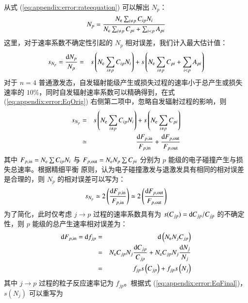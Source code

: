 从式 (\ref{eq:appendix:error:rateequation}) 可以解出 $N_p$：
\begin{equation}
N_p=\frac{N_{\rm e}\sum_{i\ne p}C_{ip}N_i}{N_{\rm e}\sum_{i\ne p}C_{pi}+\sum_{i<p}A_{pi}}
\label{eq:appendix:error:Np}
\end{equation}
这里，对于速率系数不确定性引起的 $N_p$ 相对误差，我们计入最大估计值\cite{YuChangxuan:book}：
\begin{eqnarray}
s_{N_p}=\frac{{\rm d}N_p}{N_p}& = &s\left(N_{\rm e}\sum_{i\ne p}C_{ip}N_i\right) + s\left(N_{\rm e}\sum_{i\ne p}C_{pi}+\sum_{i<p}A_{pi}\right)%
\label{eq:appendix:error:EqOrig}
\end{eqnarray}
对于 $n=4$ 普通激发态，自发辐射能级产生或损失过程的速率小于总产生或损失速率的 $10\%$，同时自发辐射速率系数可以精确得到\cite{NISTdatabase}，在式 (\ref{eq:appendix:error:EqOrig}) 右侧第二项中，忽略自发辐射过程的影响，则
\begin{eqnarray}
s_{N_p}& = &s\left(N_{\rm e}\sum_{i\ne p}C_{ip}N_i\right) + s\left(N_{\rm e}\sum_{i\ne p}C_{pi}\right) \nonumber\\
            & \simeq & \frac{{\rm d}F_{p,{\rm in}}}{F_{p,{\rm in}}} + \frac{{\rm d}F_{p,{\rm out}}}{F_{p,{\rm out}}}
\label{eq:appendix:error:EqIgnoreAqi}
\end{eqnarray}
其中 $F_{p,{\rm in}}=N_{\rm e}\sum C_{ip}N_i$ 与 $F_{p,{\rm out}}=N_{\rm e}N_p\sum C_{pi}$ 分别为 $p$ 能级的电子碰撞产生与损失总速率。根据精细平衡\cite{Lieberman2005-book} 原则，认为电子碰撞激发与退激发具有相同的相对误差是合理的，则 $N_p$ 的相对误差可以写为：
\begin{eqnarray}
s_{N_p} \simeq 2\left(\frac{{\rm d}F_{p,{\rm in}}}{F_{p,{\rm in}}}\right)
\simeq 2\left(\frac{{\rm d}F_{p,{\rm out}}}{F_{p,{\rm out}}}\right)
\label{eq:appendix:error:EqFinal}
\end{eqnarray}
为了简化，此时仅考虑 $j\to p$ 过程的速率系数具有为 $s(C_{jp})={\rm d}C_{jp}/C_{jp}$ 的不确定性\cite{Andrew2000PPCFSensitivity}，则 $p$ 能级的总产生速率相对误差为：
\begin{eqnarray}
{\rm d}F_{p,{\rm in}}={\rm d}f_{jp}&=&{\rm d}\left(N_{\rm e}N_jC_{jp}\right)\nonumber\\
&=&N_{\rm e}C_{jp}N_j\frac{{\rm d}C_{jp}}{C_{jp}}+N_{\rm e}C_{jp}N_j\frac{{\rm d}N_j}{N_j}\nonumber\\
&=&f_{jp}s\left(C_{jp}\right)+f_{jp}s\left(N_j\right)
\label{eq:appendix:error:dFin}
\end{eqnarray}
其中 $j\to p$ 过程的粒子反应速率记为 $f_{jp}$。根据式 (\ref{eq:appendix:error:EqFinal})，$s(N_j)$ 可以重写为
